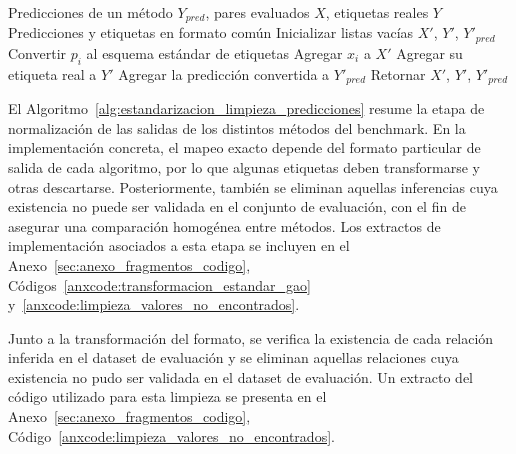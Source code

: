 \begin{algorithm}[H]
\caption{Estandarización y limpieza de predicciones}
\label{alg:estandarizacion_limpieza_predicciones}
\begin{algorithmic}[1]
\Require Predicciones de un método $Y_{pred}$, pares evaluados $X$, etiquetas reales $Y$
\Ensure Predicciones y etiquetas en formato común
\State Inicializar listas vacías $X'$, $Y'$, $Y'_{pred}$
    \State Convertir $p_i$ al esquema estándar de etiquetas
        \State Agregar $x_i$ a $X'$
        \State Agregar su etiqueta real a $Y'$
        \State Agregar la predicción convertida a $Y'_{pred}$
    \EndIf
\EndFor
\State Retornar $X'$, $Y'$, $Y'_{pred}$
\end{algorithmic}
\end{algorithm}
El Algoritmo~\ref{alg:estandarizacion_limpieza_predicciones} resume la etapa de normalización de las salidas de los distintos métodos del benchmark. En la implementación concreta, 
el mapeo exacto depende del formato particular de salida de cada algoritmo, por lo que algunas 
etiquetas deben transformarse y otras descartarse. 
Posteriormente, también se eliminan aquellas inferencias cuya existencia no puede ser validada en el conjunto de evaluación, con el fin de asegurar una comparación homogénea entre métodos. Los extractos de implementación asociados a esta etapa se incluyen en el Anexo~\ref{sec:anexo_fragmentos_codigo}, Códigos~\ref{anxcode:transformacion_estandar_gao} y~\ref{anxcode:limpieza_valores_no_encontrados}.


Junto a la transformación del formato, se verifica la existencia de cada relación inferida en el dataset de evaluación y se eliminan aquellas relaciones cuya existencia no pudo ser validada en el dataset de evaluación. Un extracto del código utilizado para esta limpieza se presenta en el Anexo~\ref{sec:anexo_fragmentos_codigo}, Código~\ref{anxcode:limpieza_valores_no_encontrados}.\\



